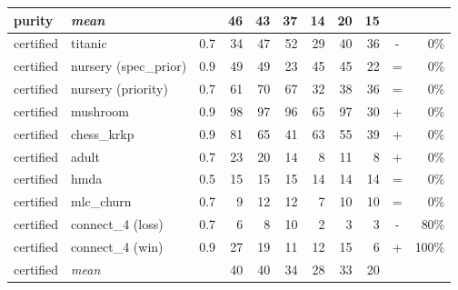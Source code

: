 \begin{tabular}{lllrrrrrrcr}
purity & \emph{mean} & & 46 & 43 & 37 & 14 & 20 & 15 & &\\
\midrule
certified & titanic & 0.7 & 34 & 47 & 52 & 29 & 40 & 36 & - & 0\%\\
certified & nursery (spec\_prior) & 0.9 & 49 & 49 & 23 & 45 & 45 & 22 & = & 0\%\\
certified & nursery (priority) & 0.7 & 61 & 70 & 67 & 32 & 38 & 36 & = & 0\%\\
certified & mushroom & 0.9 & 98 & 97 & 96 & 65 & 97 & 30 & + & 0\%\\
certified & chess\_krkp & 0.9 & 81 & 65 & 41 & 63 & 55 & 39 & + & 0\%\\
certified & adult & 0.7 & 23 & 20 & 14 & 8 & 11 & 8 & + & 0\%\\
certified & hmda & 0.5 & 15 & 15 & 15 & 14 & 14 & 14 & = & 0\%\\
certified & mlc\_churn & 0.7 & 9 & 12 & 12 & 7 & 10 & 10 & = & 0\%\\
certified & connect\_4 (loss) & 0.7 & 6 & 8 & 10 & 2 & 3 & 3 & - & 80\%\\
certified & connect\_4 (win) & 0.9 & 27 & 19 & 11 & 12 & 15 & 6 & + & 100\%\\
certified & \emph{mean} & & 40 & 40 & 34 & 28 & 33 & 20 & &\\
\bottomrule
\end{tabular}
